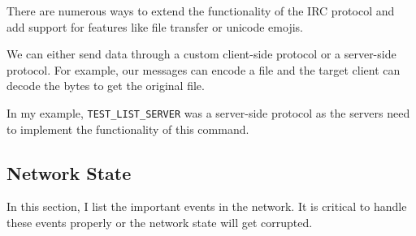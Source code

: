 \documentclass[letterpaper,twocolumn,10pt]{article}
\begin{document}
There are numerous ways to extend the functionality of the IRC
protocol and add support for features like file transfer or unicode emojis.

We can either send data through a custom client-side protocol or a server-side protocol.
For example, our messages can encode a file and the target client can decode the bytes 
to get the original file.

In my example, \verb|TEST_LIST_SERVER| was a server-side protocol as the servers need 
to implement the functionality of this command.

\subsection{Network State}

In this section, I list the important events in the network. It is critical to 
handle these events properly or the network state will get corrupted.
\end{document}
